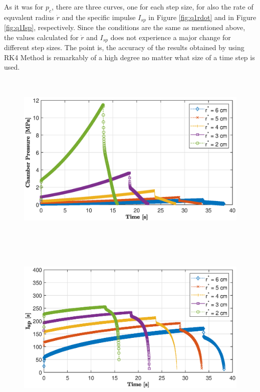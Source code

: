 \documentclass[letterpaper,12pt]{article}
\begin{document}
As it was for $p_c$, there are three curves, one for each step size, for also the rate of equvalent radius
$\dot{r}$ and the specific impulse $I_{sp}$ in Figure \ref{fig:q1rdot} and in Figure \ref{fig:q1Isp}, respectively. 
Since the conditions are the same as mentioned above, the values calculated for $\dot{r}$ and $I_{sp}$ does not 
experience a major change for different step sizes. The point is, the accuracy of the results obtained by using RK4 Method
is remarkably of a high degree no matter what size of a time step is used.

\begin{figure} [!h]
	\centering
	\includegraphics[height = 8.4cm]{graphs/q2_pc.eps}
\end{figure}
\begin{figure} [!h]
	\centering
	\includegraphics[height = 8.4cm]{graphs/q2_isp.eps}
\end{figure}
\end{document}
